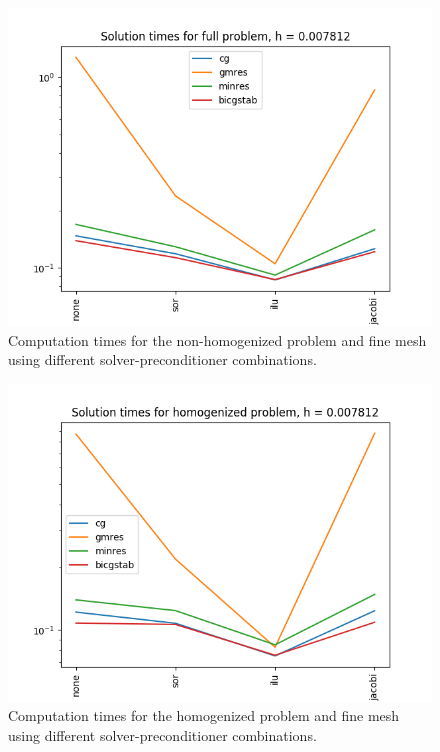 \documentclass{article}
\begin{document}
  \begin{figure}[h]
    \centering
    \includegraphics[width=0.8\linewidth]{solution_times_full_small_h.png}
    \caption{Computation times for the non-homogenized problem and fine mesh using different solver-preconditioner combinations.}
    \label{fig:solution_times_full_small_h}
  \end{figure}
  \begin{figure}[h]
    \centering
    \includegraphics[width=0.8\linewidth]{solution_times_homogenized_small_h.png}
    \caption{Computation times for the homogenized problem and fine mesh using different solver-preconditioner combinations.}
    \label{fig:solution_times_full_small_h}
  \end{figure}
\end{document}
